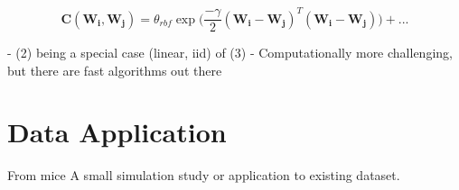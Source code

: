 \documentclass[english, 11pt]{article}\usepackage[]{graphicx}\usepackage[]{color}
\begin{document}
\begin{equation}
\mathbf{C}(\mathbf{W_i},\mathbf{W_j}) = \theta_{rbf} \exp \Big(\frac{-\gamma}{2}(\mathbf{W_i}-\mathbf{W_j})^{T}(\mathbf{W_i}-\mathbf{W_j})  \Big) + ...
\end{equation}


- (2) being a special case (linear, iid) of (3)
- Computationally more challenging, but there are fast algorithms out there






\section{Data Application}
From mice \cite{deng2014single}
A small simulation study or application to existing dataset.
\end{document}
